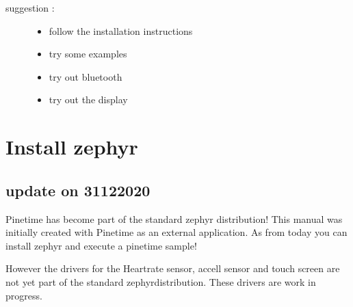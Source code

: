 \documentclass[letterpaper,10pt,english]{sphinxmanual}
\begin{document}
\begin{sphinxVerbatim}[commandchars=\\\{\}]
          
               
        
        
          
\end{sphinxVerbatim}
\begin{description}
\item[{suggestion :}] \leavevmode\begin{itemize}
\item {} 
follow the installation instructions

\item {} 
try some examples

\item {} 
try out bluetooth

\item {} 
try out the display

\end{itemize}

\end{description}

\noindent{}


\chapter{Install zephyr}
\label{\detokenize{installation:install-zephyr}}\label{\detokenize{installation::doc}}

\section{update on 31\sphinxhyphen{}12\sphinxhyphen{}2020}
\label{\detokenize{installation:update-on-31-12-2020}}
Pinetime has become part of the standard zephyr distribution!
This manual was initially created with Pinetime as an external application.
As from today you can install zephyr and execute a pinetime sample!

However the drivers for the Heartrate sensor, accell sensor and touch screen are not \sphinxhyphen{} yet \sphinxhyphen{} part of the standard zephyr\sphinxhyphen{}distribution.
These drivers are work in progress.
\end{document}
